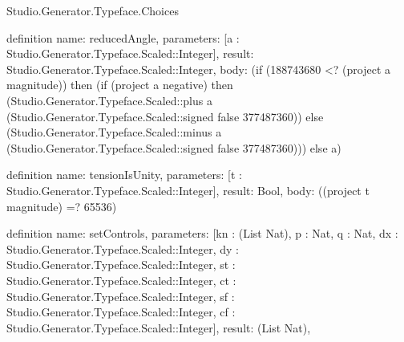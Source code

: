 \begin{lexlean}{Studio.Generator.Typeface.Choices}
\begin{semanticmodule}
definition{
  name: reducedAngle,
  parameters: [a : Studio.Generator.Typeface.Scaled::Integer],
  result: Studio.Generator.Typeface.Scaled::Integer,
  body: (if (188743680 <? (project a magnitude)) then (if (project a negative) then (Studio.Generator.Typeface.Scaled::plus a (Studio.Generator.Typeface.Scaled::signed false 377487360)) else (Studio.Generator.Typeface.Scaled::minus a (Studio.Generator.Typeface.Scaled::signed false 377487360))) else a)
}

definition{
  name: tensionIsUnity,
  parameters: [t : Studio.Generator.Typeface.Scaled::Integer],
  result: Bool,
  body: ((project t magnitude) =? 65536)
}

definition{
  name: setControls,
  parameters: [kn : (List Nat), p : Nat, q : Nat, dx : Studio.Generator.Typeface.Scaled::Integer, dy : Studio.Generator.Typeface.Scaled::Integer, st : Studio.Generator.Typeface.Scaled::Integer, ct : Studio.Generator.Typeface.Scaled::Integer, sf : Studio.Generator.Typeface.Scaled::Integer, cf : Studio.Generator.Typeface.Scaled::Integer],
  result: (List Nat),
}
\end{semanticmodule}
\end{lexlean}
